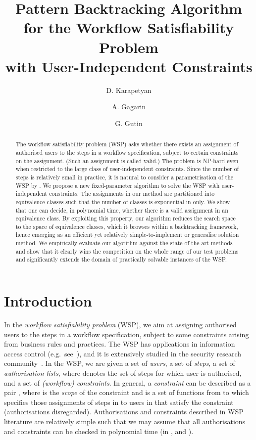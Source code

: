 \documentclass[runningheads,proof]{llncs}
\title{Pattern Backtracking Algorithm\\
for the Workflow Satisfiability Problem\\
with User-Independent Constraints}
\author{
D. Karapetyan\inst{1}
\and A. Gagarin\inst{2}
\and G. Gutin\inst{2}
}
\institute{
University of Nottingham, UK\\ 
\email{Daniel.Karapetyan@gmail.com}\\
           \and
Royal Holloway, University of London, UK \email{\{Andrei.Gagarin,G.Gutin\}@rhul.ac.uk}\\
           }
\begin{document}
\maketitle
\begin{abstract}
The workflow satisfiability problem (WSP) asks whether there exists an assignment of authorised users to the steps in a workflow specification, subject to certain constraints on the assignment.
(Such an assignment is called valid.)
The problem is NP-hard even when restricted to the large class of user-independent constraints.
Since the number of steps  is relatively small in practice, it is natural to consider a parametrisation of the WSP by .
We propose a new fixed-parameter algorithm to solve the WSP with user-independent constraints.
The assignments in our method are partitioned into equivalence classes such that the number of classes is exponential in  only.
We show that one can decide, in polynomial time, whether there is a valid assignment in an equivalence class.
By exploiting this property, our algorithm reduces the search space to the space of equivalence classes, which it browses within a backtracking framework, hence emerging as an efficient yet relatively simple-to-implement or generalise solution method.
We empirically evaluate our algorithm against the state-of-the-art methods and show that it clearly wins the competition on the whole range of our test problems and significantly extends the domain of practically solvable instances of the WSP.
\end{abstract}

\section{Introduction}\label{sec:intro}
In the \emph{workflow satisfiability problem} (WSP), we aim at assigning authorised users to the steps in a workflow specification, subject to some constraints arising from business rules and practices.
The WSP has applications in information access control (e.g.\ see~\cite{ANSI04,BaBuKa14,BeFeAt99}), and it is extensively studied in the security research community~\cite{BaBuKa14,BeFeAt99,Cr05,WaLi10}.  
In the WSP, we are given a set  of \emph{users}, a set  of \emph{steps}, a set  of \emph{authorisation lists}, where  denotes the set of steps for which user  is authorised, and a set  of \emph{(workflow) constraints}.
In general, a \emph{constraint}  can be described as a pair , where  is the \emph{scope} of the constraint and  is a set of functions from  to  which specifies those assignments of steps in  to users in  that satisfy the constraint (authorisations disregarded).  Authorisations and constraints described in WSP literature are relatively simple such that we may assume that all authorisations and constraints can be checked in polynomial time (in ,  and ).
\end{document}
